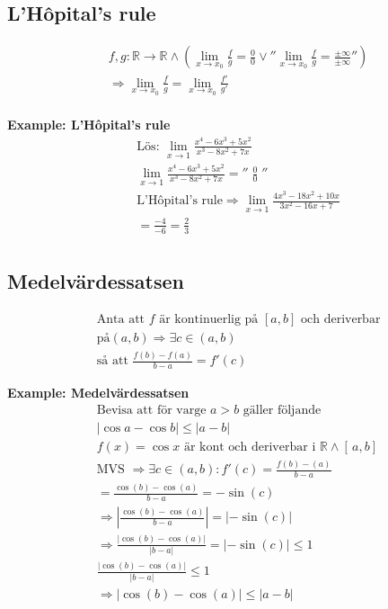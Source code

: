 \begin{multicols}{2}
  \subsection{L'Hôpital's rule} 
  \begin{align*}
    &f,g:\mathbb{R}\to\mathbb{R} \land \left( \lim_{x \to x_0}\frac{f}{g}
    =\frac{0}{0}\lor ''{\lim_{x\to x_0}\frac{f}{g}=\frac{\pm \infty}{\pm \infty}}'' \right) \\
    &\Rightarrow \lim_{x \to x_0}\frac{f}{g}=\lim_{x \to x_0}\frac{f'}{g'} \\ 
  \end{align*}

  \textbf{Example: L'Hôpital's rule}
  \begin{align*}
    &\text{Lös: } \lim_{x \to 1}\frac{x^4-6x^3+5x^2}{x^3-8x^2+7x}\\
    &\lim_{x \to 1}\frac{x^4-6x^3+5x^2}{x^3-8x^2+7x} = '' \; \frac{0}{0} \; '' \\
    &\text{L'Hôpital's rule} \Rightarrow \lim_{x \to 1}\frac{4x^3-18x^2+10x}{3x^2-16x+7} \\
    &= \frac{-4}{-6} = \frac{2}{3} \\
  \end{align*}


  \subsection{Medelvärdessatsen} 
  \begin{align*}
    &\text{Anta att $f$ är kontinuerlig på $[a,b]$ och deriverbar} \\
    &\text{på} (a,b) \Rightarrow \exists c \in (a,b) \\
    &\text{så att } \frac{f(b)-f(a)}{b-a}= f'(c)
  \end{align*}

  \textbf{Example: Medelvärdessatsen}
  \begin{align*}
    &\text{Bevisa att för varge $a>b$ gäller följande} \\
    &|\cos{a}-\cos{b}| \leq |a-b| \\
    &f(x)=\cos{x} \text{ är kont och deriverbar i } \mathbb{R} \land [ \, a,b ] \, \\
    &\text{MVS }\Rightarrow \exists c \in (a,b):f'(c)=\frac{f(b)-(a)}{b-a} \\
    &=\frac{\cos(b)-\cos(a)}{b-a}=-\sin(c) \\
    &\Rightarrow |\frac{\cos(b)-\cos(a)}{b-a}|=|-\sin(c)| \\
    &\Rightarrow \frac{|\cos(b)-\cos(a)|}{|b-a|}=|-\sin(c)| \leq 1 \\
    &\frac{|\cos(b)-\cos(a)|}{|b-a|} \leq 1 \\
    &\Rightarrow |\cos(b)-\cos(a)| \leq |a-b|
  \end{align*}



\end{multicols}

